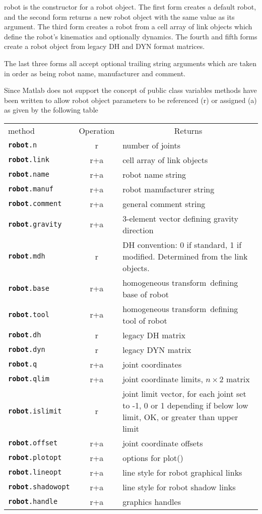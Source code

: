 \documentclass{article}
\newcommand{\mdes}[1]{\hskip -1.25in 
{\hbox{\makebox[1.25in][l]{\Refon Description}}}{#1}\vskip 0.25in}
\newcommand{\var}[1]{{\vtt #1}}
\renewcommand{\hom}{homogeneous transform}
\begin{document}
\mdes{\var{robot} is the constructor for a robot object.
The first form creates a default robot, and the second form returns a new
robot object with the same value as its argument.
The third form creates a robot from a cell array of link objects which define
the robot's kinematics and optionally dynamics.
The fourth and fifth forms create a robot object from legacy DH and DYN format
matrices.

The last three forms all accept optional trailing string arguments which are
taken in order as being robot name, manufacturer and comment.

Since Matlab does not support the concept of public class variables methods have
been written to allow robot object parameters to be referenced (r) or assigned
(a) as given by the following table
 
\begin{center}
\begin{tabular}{lcp{6cm}}
method        & Operation & \multicolumn{1}{c}{Returns} \\
\tt \textbf{robot}.n       &r   &  number of joints \\        
\tt \textbf{robot}.link    &r+a &   cell array of link objects \\
\tt \textbf{robot}.name    &r+a &   robot name string \\
\tt \textbf{robot}.manuf   &r+a &   robot manufacturer string \\
\tt \textbf{robot}.comment &r+a &  general comment string\\
\tt \textbf{robot}.gravity &r+a   &  3-element vector defining gravity direction\\
\tt \textbf{robot}.mdh     &r   & DH convention: 0 if standard, 1 if modified.  Determined
from the link objects.\\ \hline
\tt \textbf{robot}.base    &r+a & \hom\ defining base of robot\\
\tt \textbf{robot}.tool    &r+a & \hom\ defining tool of robot\\
\tt \textbf{robot}.dh      &r   &  legacy DH matrix \\
\tt \textbf{robot}.dyn     &r   & legacy DYN matrix \\
\tt \textbf{robot}.q  &r+a   & joint coordinates \\
\tt \textbf{robot}.qlim  &r+a   & joint coordinate limits, $n \times 2$ matrix \\
\tt \textbf{robot}.islimit  &r   & joint limit vector, for each joint set to
-1, 0 or 1 depending if below low limit, OK, or greater than upper limit\\
\tt \textbf{robot}.offset  &r+a   & joint coordinate offsets \\
\tt \textbf{robot}.plotopt  &r+a   & options for \var{plot()}\\
\tt \textbf{robot}.lineopt  &r+a   & line style for robot graphical links \\
\tt \textbf{robot}.shadowopt  &r+a   & line style for robot shadow links \\
\tt \textbf{robot}.handle  &r+a   & graphics handles
\end{tabular}
\end{center} 

}
\end{document}
